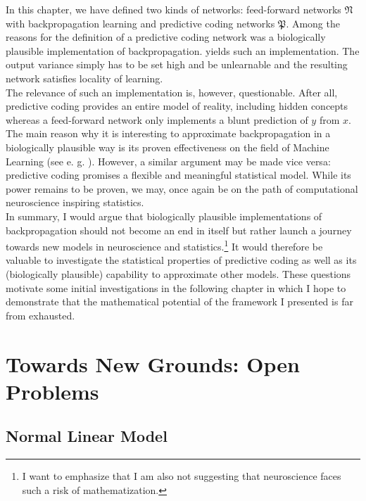 \documentclass[a4paper,11pt]{report}
\begin{document}
\begin{Par}
In this chapter, we have defined two kinds of networks: feed-forward networks $\mathfrak{N}$ with backpropagation learning and predictive coding networks $\mathfrak{P}$. Among the reasons for the definition of a predictive coding network was a biologically plausible implementation of backpropagation.  yields such an implementation. The output variance simply has to be set high and be unlearnable and the resulting network satisfies locality of learning.\\
The relevance of such an implementation is, however, questionable. After all, predictive coding provides an entire model of reality, including hidden concepts whereas a feed-forward network only implements a blunt prediction of $y$ from $x$. The main reason why it is interesting to approximate backpropagation in a biologically plausible way is its proven effectiveness on the field of Machine Learning (see e. g. \cite{Whittington2017, Liao2015}). However, a similar argument may be made vice versa: predictive coding promises a flexible and meaningful statistical model. While its power remains to be proven, we may, once again be on the path of computational neuroscience inspiring statistics.\\
In summary, I would argue that biologically plausible implementations of backpropagation should not become an end in itself but rather launch a journey towards new models in neuroscience and statistics.\footnote{
I want to emphasize that I am also not suggesting that neuroscience faces such a risk of mathematization.} It would therefore be valuable to investigate the statistical properties of predictive coding as well as its (biologically plausible) capability to approximate other models. These questions motivate some initial investigations in the following chapter in which I hope to demonstrate that the mathematical potential of the framework I presented is far from exhausted.
\end{Par}

\chapter{Towards New Grounds: Open Problems}\label{ch:further-work}

\section{Normal Linear Model}
\end{document}
